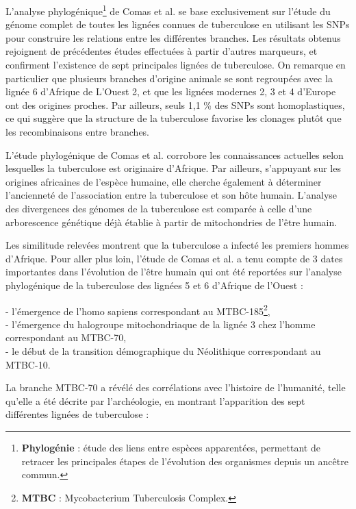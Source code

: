 \documentclass[twoside,a4paper,11pt,frenchb,openany]{report}
\begin{document}
L'analyse phylogénique\footnote{\textbf{Phylogénie} : étude des liens entre espèces apparentées, permettant de retracer les principales étapes de l'évolution des organismes depuis un ancêtre commun.} de Comas et al.\cite{comas} se base exclusivement sur l'étude du génome complet de toutes les lignées connues de tuberculose en utilisant les SNPs pour construire les relations entre les différentes branches. Les résultats obtenus rejoignent de précédentes études effectuées à partir d'autres marqueurs, et confirment l'existence de sept principales lignées de tuberculose. On remarque en particulier que plusieurs branches d'origine animale se sont regroupées avec la lignée 6 d'Afrique de L'Ouest 2, et que les lignées modernes 2, 3 et 4 d'Europe ont des origines proches. Par ailleurs, seuls 1,1 \% des SNPs sont homoplastiques, ce qui suggère que la structure de la tuberculose favorise les clonages plutôt que les recombinaisons entre branches.  


L'étude phylogénique de Comas et al.\cite{comas} corrobore les connaissances actuelles selon lesquelles la tuberculose est originaire d'Afrique. Par ailleurs, s'appuyant sur les origines africaines de l'espèce humaine, elle cherche également à déterminer l'ancienneté de l'association entre la tuberculose et son hôte humain. L'analyse des divergences des génomes de la tuberculose est comparée à celle d'une arborescence génétique déjà établie à partir de mitochondries de l'être humain. 


Les similitude relevées montrent que la tuberculose a infecté les premiers hommes d'Afrique. Pour aller plus loin, l'étude de Comas et al. a tenu compte de 3 dates importantes dans l'évolution de l'être humain qui ont été reportées sur l'analyse phylogénique de la tuberculose des lignées 5 et 6 d'Afrique de l'Ouest :

- l'émergence de l'homo sapiens correspondant au MTBC-185\footnote{\textbf{MTBC} : Mycobacterium Tuberculosis Complex.},\\
- l'émergence du halogroupe mitochondriaque de la lignée 3 chez l'homme correspondant au MTBC-70,\\
- le début de la transition démographique du Néolithique correspondant au MTBC-10.

La branche MTBC-70 a révélé des corrélations avec l'histoire de l'humanité, telle qu'elle a été décrite par l'archéologie, en montrant l'apparition des sept différentes lignées de tuberculose :
\end{document}
